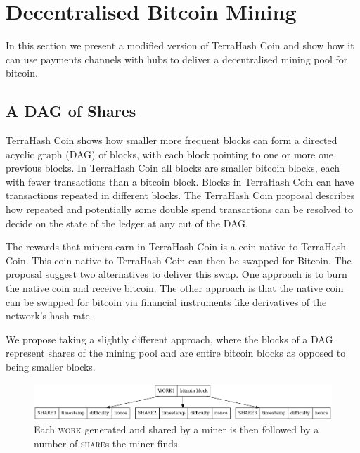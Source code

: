 \documentclass{article}
\begin{document}
\section{Decentralised Bitcoin Mining}

In this section we present a modified version of TerraHash Coin and
show how it can use payments channels with hubs to deliver a
decentralised mining pool for bitcoin.

\subsection{A DAG of Shares}

TerraHash Coin shows how smaller more frequent blocks can form a
directed acyclic graph (DAG) of blocks, with each block pointing to
one or more one previous blocks. In TerraHash Coin all blocks are
smaller bitcoin blocks, each with fewer transactions than a bitcoin
block. Blocks in TerraHash Coin can have transactions repeated in
different blocks. The TerraHash Coin proposal describes how repeated
and potentially some double spend transactions can be resolved to
decide on the state of the ledger at any cut of the DAG.\

The rewards that miners earn in TerraHash Coin is a coin native to
TerraHash Coin. This coin native to TerraHash Coin can then be swapped
for Bitcoin. The proposal suggest two alternatives to deliver this
swap. One approach is to burn the native coin and receive bitcoin. The
other approach is that the native coin can be swapped for bitcoin via
financial instruments like derivatives of the network's hash rate.

We propose taking a slightly different approach, where the blocks of a
DAG represent shares of the mining pool and are entire bitcoin blocks
as opposed to being smaller blocks.

\begin{figure}[h]
  \begin{center}
    \includegraphics[width=1.0\textwidth]{work-share}
    \caption{Each \textsc{work} generated and shared by a miner is then
      followed by a number of \textsc{share}s the miner
      finds.}\label{fig:work-share}
    \end{center}
\end{figure}
\end{document}
